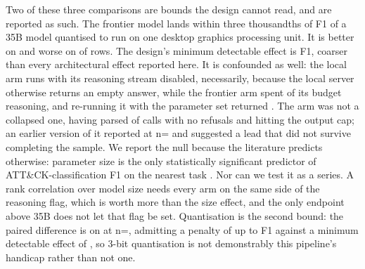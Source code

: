 Two of these three comparisons are bounds the design cannot read, and are reported as such. The frontier model lands within three thousandths of F1 of a 35B model quantised to run on one
desktop graphics processing unit. It is better on  and worse on
 of  rows. The design's minimum detectable
effect is  F1, coarser than every architectural effect reported here. It is confounded as well: the local
arm runs with its reasoning stream disabled, necessarily, because the local server otherwise returns
an empty answer, while the frontier arm spent  of its budget reasoning,
and re-running it with the parameter set returned . The arm was not a collapsed one, having
parsed  of  calls with no refusals and
 hitting the output cap; an earlier version of it reported
 at n= and suggested a lead that did not
survive completing the sample. We report the null because the literature predicts otherwise: parameter size is the only
statistically significant predictor of ATT\&CK-classification F1 on the nearest task
. Nor can we test it as a series. A rank correlation over model size
needs every arm on the same side of the reasoning flag, which is worth more than the size effect,
and the only endpoint above 35B does not let that flag be set. Quantisation is the second bound: the
paired difference is  on  at
n=, admitting a penalty of up to  F1 against a
minimum detectable effect of , so 3-bit quantisation is not demonstrably this
pipeline's handicap rather than not one.

